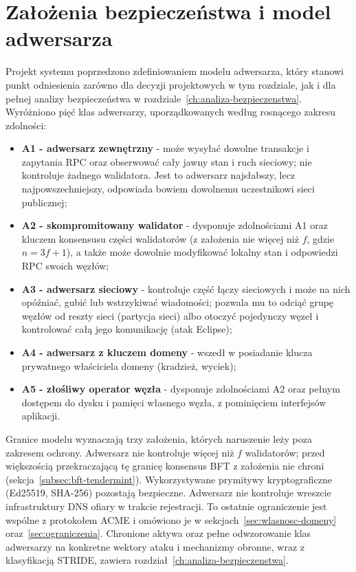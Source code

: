 \section{Założenia bezpieczeństwa i model adwersarza}
\label{sec:zalozenia-adwersarz}

Projekt systemu poprzedzono zdefiniowaniem modelu adwersarza, który stanowi punkt odniesienia zarówno dla decyzji projektowych w tym rozdziale, jak i dla pełnej analizy bezpieczeństwa w rozdziale~\ref{ch:analiza-bezpieczenstwa}. Wyróżniono pięć klas adwersarzy, uporządkowanych według rosnącego zakresu zdolności:
\begin{itemize}
    \item \textbf{A1 - adwersarz zewnętrzny} - może wysyłać dowolne transakcje i zapytania RPC oraz obserwować cały jawny stan i ruch sieciowy; nie kontroluje żadnego walidatora. Jest to adwersarz najsłabszy, lecz najpowszechniejszy, odpowiada bowiem dowolnemu uczestnikowi sieci publicznej;
    \item \textbf{A2 - skompromitowany walidator} - dysponuje zdolnościami A1 oraz kluczem konsensusu części walidatorów (z założenia nie więcej niż $f$, gdzie $n = 3f + 1$), a także może dowolnie modyfikować lokalny stan i odpowiedzi RPC swoich węzłów;
    \item \textbf{A3 - adwersarz sieciowy} - kontroluje część łączy sieciowych i może na nich opóźniać, gubić lub wstrzykiwać wiadomości; pozwala mu to odciąć grupę węzłów od reszty sieci (partycja sieci) albo otoczyć pojedynczy węzeł i kontrolować całą jego komunikację (atak Eclipse);
    \item \textbf{A4 - adwersarz z kluczem domeny} - wszedł w posiadanie klucza prywatnego właściciela domeny (kradzież, wyciek);
    \item \textbf{A5 - złośliwy operator węzła} - dysponuje zdolnościami A2 oraz pełnym dostępem do dysku i pamięci własnego węzła, z pominięciem interfejsów aplikacji.
\end{itemize}

Granice modelu wyznaczają trzy założenia, których naruszenie leży poza zakresem ochrony. Adwersarz nie kontroluje więcej niż $f$ walidatorów; przed większością przekraczającą tę granicę konsensus BFT z założenia nie chroni (sekcja~\ref{subsec:bft-tendermint}). Wykorzystywane prymitywy kryptograficzne (Ed25519, SHA-256) pozostają bezpieczne. Adwersarz nie kontroluje wreszcie infrastruktury DNS ofiary w trakcie rejestracji. To ostatnie ograniczenie jest wspólne z protokołem ACME i omówiono je w sekcjach~\ref{sec:wlasnosc-domeny} oraz~\ref{sec:ograniczenia}. Chronione aktywa oraz pełne odwzorowanie klas adwersarzy na konkretne wektory ataku i mechanizmy obronne, wraz z klasyfikacją STRIDE, zawiera rozdział~\ref{ch:analiza-bezpieczenstwa}.

